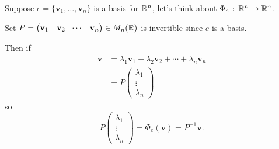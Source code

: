 \documentclass[10pt, a4paper]{article}
\newcommand{\mbf}[1]{\mathbf{#1}}
\begin{document}
Suppose $e = \{\mbf{v}_1, \dotsc, \mbf{v}_n\}$ is a basis for $\mathbb{R} ^ n$,
let's think about $\Phi_e\,:\,\mathbb{R} ^ n \rightarrow \mathbb{R} ^ n$.

Set $P = \begin{pmatrix}
    \mbf{v}_1 & \mbf{v}_2 & \dotsi & \mbf{v}_n
\end{pmatrix} \in M_n(\R)$
is invertible since $e$ is a basis.

Then if
\begin{align*}
    \mbf{v} &= \lambda_1\mbf{v}_1 + \lambda_2\mbf{v}_2 + \dotsi + \lambda_n\mbf{v}_n \\
    &= P\begin{pmatrix}
        \lambda_1 \\ \vdots \\ \lambda_n
    \end{pmatrix}
\end{align*}
so
\[
P\begin{pmatrix}
    \lambda_1 \\ \vdots \\ \lambda_n
\end{pmatrix} = \Phi_e(\mbf{v}) = P ^ {-1}\mbf{v}.
\]
\end{document}
